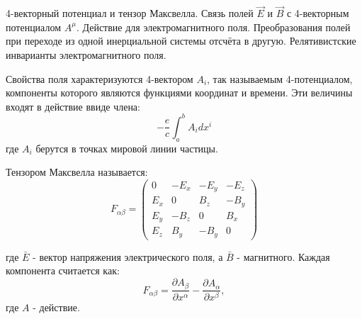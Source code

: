 \documentclass[__main__.tex]{subfiles}
\begin{document}
4-векторный потенциал и тензор Максвелла. Связь полей $\vec{E}$ и $\vec{B}$ с 4-векторным потенциалом $A^\mu$. Действие для электромагнитного поля. Преобразования полей при переходе из одной инерциальной системы отсчёта в другую. Релятивистские инварианты электромагнитного поля.\\

\begin{definition}
    Свойства поля характеризуются 4-вектором $A_i$, так называемым 4-потенциалом, компоненты которого являются функциями координат и времени. Эти величины входят в действие ввиде члена:
    $$-\frac{e}{c}\int_{a}^{b}A_idx^i$$
    где $A_i$ берутся в точках мировой линии частицы.
\end{definition}
\begin{definition}
    Тензором Максвелла называется:
    $$F_{\alpha\beta}=
        \begin{pmatrix}
            0   & -E_x & -E_y & -E_z \\
            E_x & 0    & B_z  & -B_y \\
            E_y & -B_z & 0    & B_x  \\
            E_z & B_y  & -B_y & 0
        \end{pmatrix}$$
\end{definition}
где $\bar E$ - вектор напряжения электрического поля, а $\bar B$ - магнитного.
Каждая компонента считается как:
$$
    F_{\alpha\beta}=\frac{\partial A_\beta}{\partial x^{\alpha}}
    -\frac{\partial A_\alpha}{\partial x^{\beta}},
$$
где $A$ - действие.
\end{document}
